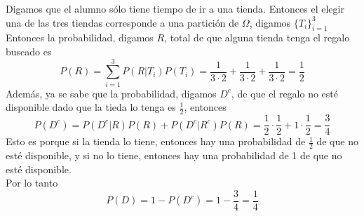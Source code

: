 \documentclass[12pt,a4paper]{report}
\begin{document}
\begin{enumerate}
{		Digamos que el alumno sólo tiene tiempo de ir a una tienda. Entonces el elegir
		una de las tres tiendas corresponde a una partición de $\Omega$, digamos $\{T_i\}_{i = 1}^3$
		Entonces la probabilidad, digamos $R$, total de que alguna tienda tenga el regalo buscado es
		\begin{equation*}
			P(R) = \sum_{i = 1}^3 P(R | T_i) P(T_i) = \frac{1}{3 \cdot 2}
			+ \frac{1}{3 \cdot 2} + \frac{1}{3 \cdot 2} = \frac{1}{2}
		\end{equation*}
		Además, ya se sabe que la probabilidad, digamos $D^c$, de que el regalo no esté
		disponible dado que la tieda lo tenga es $\frac{1}{2}$, entonces
		\begin{equation*}
			P(D^c) = P(D^c | R)P(R) + P(D^c | R^c)P(R) = \frac{1}{2} \cdot \frac{1}{2}
			+ 1 \cdot \frac{1}{2} = \frac{3}{4}
		\end{equation*}
		Esto es porque si la tienda lo tiene, entonces hay una probabilidad de
		$\frac{1}{2}$ de que no esté disponible, y si no lo tiene, entonces hay una
		probabilidad de 1 de que no esté disponible. \\
		Por lo tanto
		\begin{equation*}
			P(D) = 1 - P(D^c) = 1 - \frac{3}{4} = \frac{1}{4}
		\end{equation*}
  }






\end{enumerate}
\end{document}
